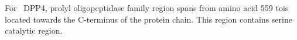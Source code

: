 For~ DPP4, prolyl oligopeptidase family region spans from amino acid 559 tois located towards the C-terminus of the protein chain. This region contains serine catalytic region.  